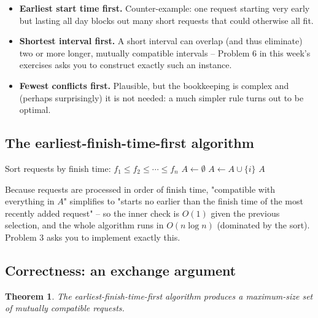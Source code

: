 \documentclass[11pt]{article}
\newtheorem{theorem}{Theorem}[section]
\begin{document}
\begin{itemize}
    \item \textbf{Earliest start time first.} Counter-example: one request starting very
    early but lasting all day blocks out many short requests that could otherwise all fit.
    \item \textbf{Shortest interval first.} A short interval can overlap (and thus
    eliminate) two or more longer, mutually compatible intervals -- Problem 6 in this
    week's exercises asks you to construct exactly such an instance.
    \item \textbf{Fewest conflicts first.} Plausible, but the bookkeeping is complex and
    (perhaps surprisingly) it is not needed: a much simpler rule turns out to be optimal.
\end{itemize}

\subsection{The earliest-finish-time-first algorithm}

\begin{algorithm}[h]
\caption{Earliest-Finish-Time-First (Interval Scheduling)}
\begin{algorithmic}[1]
\State Sort requests by finish time: $f_1 \le f_2 \le \cdots \le f_n$
\State $A \gets \emptyset$
        \State $A \gets A \cup \{i\}$
    \EndIf
\EndFor
\State \Return $A$
\end{algorithmic}
\end{algorithm}

Because requests are processed in order of finish time, "compatible with everything in
$A$" simplifies to "starts no earlier than the finish time of the most recently added
request" -- so the inner check is $O(1)$ given the previous selection, and the whole
algorithm runs in $O(n \log n)$ (dominated by the sort). Problem 3 asks you to implement
exactly this.

\subsection{Correctness: an exchange argument}

\begin{theorem}
The earliest-finish-time-first algorithm produces a maximum-size set of mutually
compatible requests.
\end{theorem}
\end{document}
